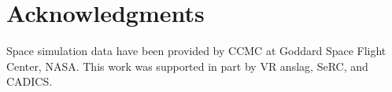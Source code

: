 \documentclass{egpubl}
\newcommand{\red}[1]{{\color{red}#1}}
\newlength{\boxheight}
\begin{document}
\section*{Acknowledgments}
\label{sec:acknowledgments}
Space simulation data have been provided by CCMC at Goddard Space Flight Center, NASA. 
This work was supported in part by
 \red{VR anslag}, \red{SeRC}, and \red{CADICS}.

\begin{figure}[p]
  \centering
  \savebox{}
  \settoheight{\boxheight}{\usebox\savedProteinBox}
  \begin{minipage}[b][\boxheight][b]{0.24\linewidth}
    \centering%
    \begin{minipage}[t]{0.98\linewidth}

\end{minipage}
\end{minipage}
\end{figure}
\end{document}
